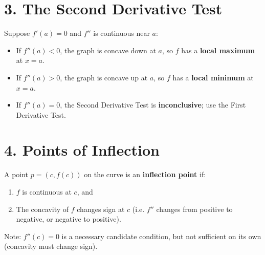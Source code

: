 \documentclass[10.5pt]{article}
\begin{document}
\section*{3. The Second Derivative Test}
Suppose $f'(a) = 0$ and $f''$ is continuous near $a$:
\begin{itemize}[leftmargin=1.5em]
  \item If $f''(a) < 0$, the graph is concave down at $a$, so $f$ has a \textbf{local maximum} at $x = a$.
  \item If $f''(a) > 0$, the graph is concave up at $a$, so $f$ has a \textbf{local minimum} at $x = a$.
  \item If $f''(a) = 0$, the Second Derivative Test is \textbf{inconclusive}; use the First Derivative Test.
\end{itemize}

\section*{4. Points of Inflection}
A point $p = (c, f(c))$ on the curve is an \textbf{inflection point} if:
\begin{enumerate}[leftmargin=1.5em]
  \item $f$ is continuous at $c$, and
  \item The concavity of $f$ changes sign at $c$ (i.e. $f''$ changes from positive to negative, or negative to positive).
\end{enumerate}
Note: $f''(c) = 0$ is a necessary candidate condition, but not sufficient on its own (concavity must change sign).
\end{document}
